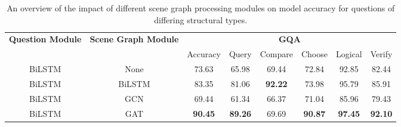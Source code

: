 \begin{table}[htbp]
\centering
\begin{footnotesize}
\begin{tabular}{cc|c|ccccc}
\toprule
\multirow{3}{0.1\textwidth}{\textbf{Question Module}} & \multirow{3}{0.1\textwidth}{\textbf{Scene Graph Module}} & \multicolumn{6}{c}{\multirow{2}{*}{\textbf{GQA}}}                                                   \\
                                          &                                              & \multicolumn{6}{c}{}                                                                                \\ \cmidrule(l){3-8} 
                                          &                                              & Accuracy       & Query          & Compare        & Choose         & Logical        & Verify         \\ \midrule
BiLSTM                                    & None                                         & 73.63          & 65.98          & 69.44          & 72.84          & 92.85          & 82.44          \\
BiLSTM                                    & BiLSTM                                       & 83.35          & 81.06          & \textbf{92.22}          & 73.98          & 95.79          & 85.91          \\
BiLSTM                                    & GCN                                          & 69.44          & 61.34          & 66.37          & 71.04          & 85.96          & 79.43          \\
\midrule
BiLSTM                                    & GAT                                          & \textbf{90.45} & \textbf{89.26} & 69.69          & \textbf{90.87} & \textbf{97.45} & \textbf{92.10} \\ \bottomrule
\end{tabular}
\end{footnotesize}
\caption[Scene graph processing module ablation performance for questions of differing structural types.]{An overview of the impact of different scene graph processing modules on model accuracy for questions of differing structural types.}
\label{table:scene_graph_ablation_structural}
\end{table}

